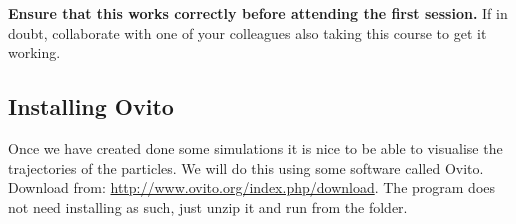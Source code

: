 \textbf{Ensure that this works correctly before attending the first session.} If in doubt, collaborate with one of your colleagues also taking this course to get it working.


\subsection{Installing Ovito}

Once we have created done some simulations it is nice to be able to visualise the trajectories of the particles. We will do this using some software called Ovito. Download from: \url{http://www.ovito.org/index.php/download}. The program does not need installing as such, just unzip it and run from the folder.